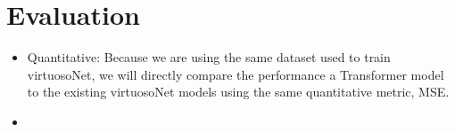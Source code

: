 \section{Evaluation}
\begin{itemize}
    \item Quantitative: Because we are using the same dataset used to train virtuosoNet, we will directly compare the performance a Transformer model to the existing virtuosoNet models using the same quantitative metric, MSE. 
    \item {}
\end{itemize}
